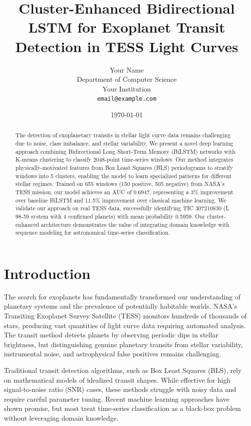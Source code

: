 \documentclass[twocolumn]{article}
\title{Cluster-Enhanced Bidirectional LSTM for Exoplanet Transit Detection in TESS Light Curves}
\author{
  Your Name\\
  Department of Computer Science\\
  Your Institution\\
  \texttt{email@example.com}
}
\date{\today}
\begin{document}
\maketitle

\begin{abstract}
The detection of exoplanetary transits in stellar light curve data remains challenging due to noise, class imbalance, and stellar variability. We present a novel deep learning approach combining Bidirectional Long Short-Term Memory (BiLSTM) networks with K-means clustering to classify 2048-point time-series windows. Our method integrates physically-motivated features from Box Least Squares (BLS) periodograms to stratify windows into 5 clusters, enabling the model to learn specialized patterns for different stellar regimes. Trained on 655 windows (150 positive, 505 negative) from NASA's TESS mission, our model achieves an AUC of 0.6947, representing a 3\% improvement over baseline BiLSTM and 11.5\% improvement over classical machine learning. We validate our approach on real TESS data, successfully identifying TIC 307210830 (L 98-59 system with 4 confirmed planets) with mean probability 0.5959. Our cluster-enhanced architecture demonstrates the value of integrating domain knowledge with sequence modeling for astronomical time-series classification.
\end{abstract}

\section{Introduction}

The search for exoplanets has fundamentally transformed our understanding of planetary systems and the prevalence of potentially habitable worlds. NASA's Transiting Exoplanet Survey Satellite (TESS) monitors hundreds of thousands of stars, producing vast quantities of light curve data requiring automated analysis. The transit method detects planets by observing periodic dips in stellar brightness, but distinguishing genuine planetary transits from stellar variability, instrumental noise, and astrophysical false positives remains challenging.

Traditional transit detection algorithms, such as Box Least Squares (BLS), rely on mathematical models of idealized transit shapes. While effective for high signal-to-noise ratio (SNR) cases, these methods struggle with noisy data and require careful parameter tuning. Recent machine learning approaches have shown promise, but most treat time-series classification as a black-box problem without leveraging domain knowledge.
\end{document}
